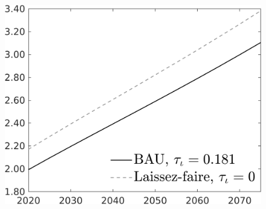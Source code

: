 \documentclass[12pt]{article}
\begin{document}
\begin{figure}[h!!]
\begin{minipage}[]{0.32\textwidth}
	\end{minipage}	
	\begin{minipage}[]{0.32\textwidth}
		\includegraphics[width=1\textwidth]{../../codding_model/own_basedOnFried/optimalPol_010922_revision/figures/all_13Sept22/CompTaul_Equlab_LFBAU_Reg0_N_spillover0_nsk1_xgr0_knspil1_sep1_countec0_GovRev0_etaa0.79_lgd1.png}
	\end{minipage}	
\end{figure}
\end{document}
